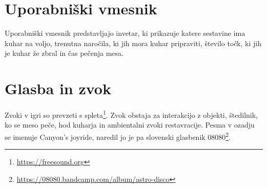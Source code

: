 \documentclass[a4paper]{article}
\begin{document}
\section{Uporabniški vmesnik}
Uporabniški vmesnik predstavljajo invetar, ki prikazuje katere sestavine ima kuhar na voljo, trenutna naročila, ki jih mora kuhar pripraviti, število točk, ki jih je kuhar že zbral in čas pečenja mesa.

\section{Glasba in zvok}
Zvoki v igri so prevzeti s spleta\footnote{\url{https://freesound.org}}. Zvok obstaja za interakcijo z objekti, štedilnik, ko se meso peče, hod kuharja in ambientalni zvoki restavracije.
Pesma v ozadju se imenuje Canyon's joyride, naredil jo je pa slovenski glasbenik 08080\footnote{\url{https://08080.bandcamp.com/album/astro-disco}}.
\end{document}
